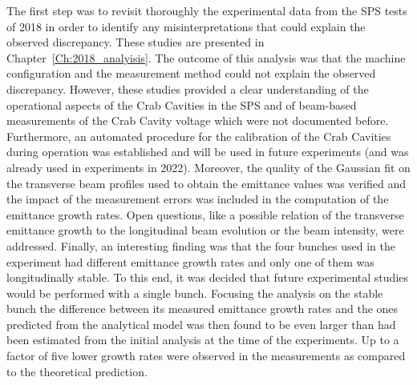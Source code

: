 The first step was to revisit thoroughly the experimental data from the SPS tests of 2018 in order to identify any misinterpretations that could explain the observed discrepancy. These studies are presented in Chapter~\ref{Ch:2018_analyisis}. The outcome of this analysis was that the machine configuration and the measurement method could not explain the observed discrepancy. However, these studies provided a clear understanding of the operational aspects of the Crab Cavities in the SPS and of beam-based measurements of the Crab Cavity voltage which were not documented before. Furthermore, an automated procedure for the calibration of the Crab Cavities during operation was established and will be used in future experiments (and was already used in experiments in 2022). Moreover, the quality of the  Gaussian fit on the transverse beam profiles used to obtain the emittance values was verified and the impact of the measurement errors was included in the computation of the emittance growth rates. Open questions, like a possible relation of the transverse emittance growth to the longitudinal beam evolution or the beam intensity, were addressed. Finally, an interesting finding was that the four bunches used in the experiment had different emittance growth rates and only one of them was longitudinally stable. To this end, it was decided that future experimental studies would be performed with a single bunch. Focusing the analysis on the stable bunch the difference between its measured emittance growth rates and the ones predicted from the analytical model was then found to be even larger than had been estimated from the initial analysis at the time of the experiments. Up to a factor of five lower growth rates were observed in the measurements as compared to the theoretical prediction. 

